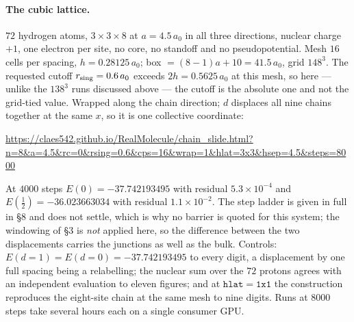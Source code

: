 \documentclass[11pt]{article}
\newcommand{\half}{\tfrac12}
\begin{document}
\paragraph{The cubic lattice.} $72$ hydrogen atoms, $3\times3\times8$ at $a=4.5\,a_0$ in all three
directions, nuclear charge $+1$, one electron per site, no core, no standoff and no pseudopotential.
Mesh $16$ cells per spacing, $h=0.28125\,a_0$; box $=(8-1)a+10=41.5\,a_0$, grid $148^3$. The
requested cutoff $r_{\rm sing}=0.6\,a_0$ exceeds $2h=0.5625\,a_0$ at this mesh, so here --- unlike
the $138^3$ runs discussed above --- the cutoff is the absolute one and not the grid-tied value.
Wrapped along the chain direction; $d$ displaces all nine chains together at the same $x$, so it is
one collective coordinate:
\begin{center}\small\url{https://claes542.github.io/RealMolecule/chain_slide.html?n=8&a=4.5&rc=0&rsing=0.6&cps=16&wrap=1&hlat=3x3&hsep=4.5&steps=8000}\end{center}
At $4000$ steps $E(0)=-37.742193495$ with residual $5.3\times10^{-4}$ and
$E(\half)=-36.023663034$ with residual $1.1\times10^{-2}$. The step ladder is given in full in \S8
and does not settle, which is why no barrier is quoted for this system; the windowing of \S3 is
\emph{not} applied here, so the difference between the two displacements carries the junctions as
well as the bulk. Controls: $E(d{=}1)=E(d{=}0)=-37.742193495$ to every digit, a displacement by one
full spacing being a relabelling; the nuclear sum over the $72$ protons agrees with an independent
evaluation to eleven figures; and at $\mathtt{hlat=1x1}$ the construction reproduces the eight-site
chain at the same mesh to nine digits. Runs at $8000$ steps take several hours each on a single
consumer GPU.
\end{document}
